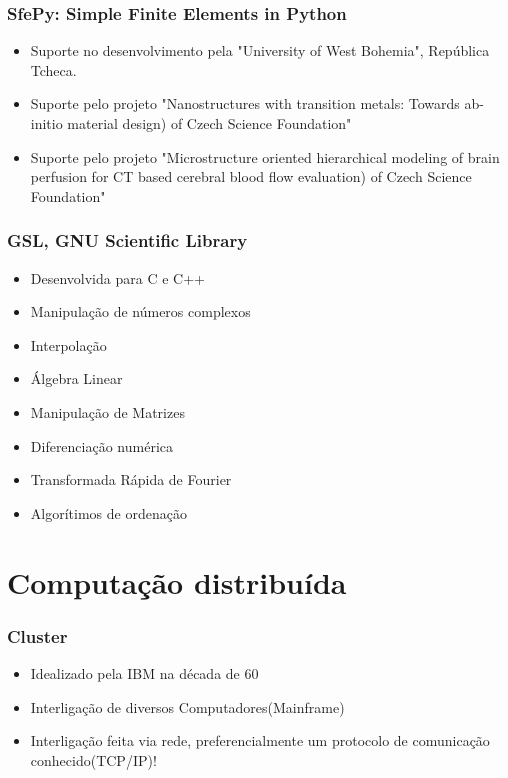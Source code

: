 \documentclass{beamer}
\begin{document}
\begin{frame}
    \frametitle{SfePy: Simple Finite Elements in Python}

    \begin{itemize}
        \item Suporte no desenvolvimento pela "University of West Bohemia", República Tcheca.
        \item Suporte pelo projeto "Nanostructures with transition metals: Towards ab-initio material design) of Czech Science Foundation"
        \item Suporte pelo projeto "Microstructure oriented hierarchical modeling of brain perfusion for CT based cerebral blood flow evaluation) of Czech Science Foundation"
    \end{itemize}
\end{frame}

\begin{frame}
    \frametitle{GSL, GNU Scientific Library}

    \begin{itemize}
        \item Desenvolvida para C e C++
        \item Manipulação de números complexos
        \item Interpolação
        \item Álgebra Linear
        \item Manipulação de Matrizes
        \item Diferenciação numérica
        \item Transformada Rápida de Fourier
        \item Algorítimos de ordenação
    \end{itemize}
\end{frame}

\section{Computação distribuída}

\begin{frame}
    \frametitle{Cluster}

\begin{itemize}
    \item Idealizado pela IBM na década de 60
    \item Interligação de diversos Computadores(Mainframe)
    \item Interligação feita via rede, preferencialmente um protocolo de comunicação conhecido(TCP/IP)!
\end{itemize}
\end{frame}
\end{document}
